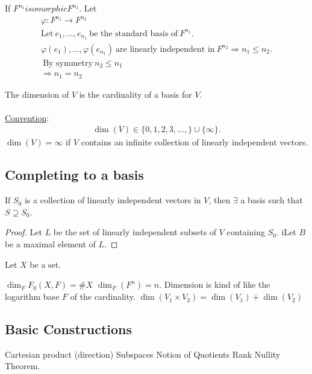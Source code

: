 \documentclass[class=scrartcl, crop=false]{standalone}
\begin{document}
\begin{example}
  If $F^{n_1} isomorphic F^{n_2}$. Let
  \begin{gather*}
    \varphi: F^{n_1} \to F^{n_2} \\
    \text{Let} \ e_1, \dots, e_{n_1} \ \text{be the standard basis of} \ F^{n_1}. \\
    \varphi(e_1), \dots, \varphi(e_{n_1}) \ \text{are linearly independent in} \ F^{n_2} \Rightarrow n_1 \leq n_2. \\
    \ \text{By symmetry} \ n_2 \leq n_1 \\
    \Rightarrow n_1 = n_2
  \end{gather*} 
\end{example} 

\begin{definition}[Dimension]
  The dimension of $V$ is the cardinality of a basis for $V$.
  \\\\
  \ul{Convention}: 
  \begin{gather*}
    \dim(V) \in \{0, 1, 2, 3, \dots, \} \cup \{\infty\}.
  \end{gather*} 
  $\dim(V) = \infty$ if $V$ contains an infinite collection of linearly independent vectors.
\end{definition} 

\subsection{Completing to a basis}

\begin{proposition}
  If $S_0$ is a collection of linearly independent vectors in $V$, then $\exists$ a basis such that $S \supseteq S_0$.
  \begin{proof}
    Let $L$ be the set of linearly independent subsets of $V$ containing $S_0$. iLet $B$ be a maximal element of $L$.
  \end{proof} 
\end{proposition} 

\begin{example}
  Let $X$ be a set.
  \begin{enumerate}
    \ii
    $\dim_FF_0(X, F) = \#X$
    \ii
    $\dim_F(F^n) = n$. Dimension is kind of like the logarithm base $F$ of the cardinality.
    \ii
    $\dim(V_1 \times V_2) = \dim(V_1) + \dim(V_2)$
  \end{enumerate} 
\end{example} 

\subsection{Basic Constructions}

\begin{enumerate}
  \ii
  Cartesian product (direction)
  \ii
  Subspaces
  \ii
  Notion of Quotients
  \ii
  Rank Nullity Theorem.
\end{enumerate} 
\end{document}
